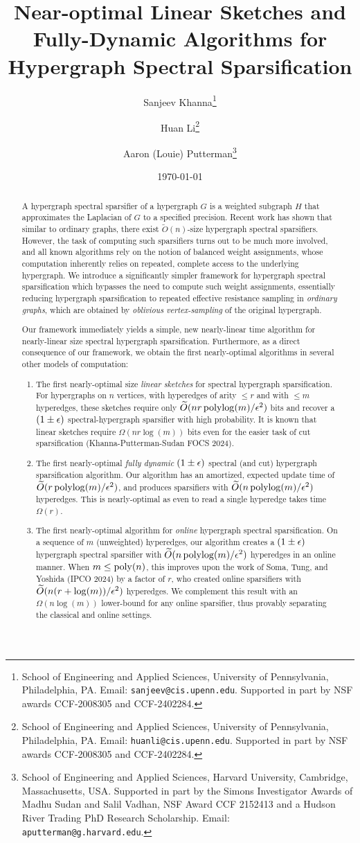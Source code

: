 \documentclass{article}
\title{
Near-optimal Linear Sketches and Fully-Dynamic Algorithms for Hypergraph Spectral Sparsification
}
\author{Sanjeev Khanna\thanks{School of Engineering and Applied Sciences, University of Pennsylvania, Philadelphia, PA. Email: \texttt{sanjeev@cis.upenn.edu}.
Supported in part by NSF awards CCF-2008305 and CCF-2402284.} \and Huan Li\thanks{School of Engineering and Applied Sciences, University of Pennsylvania, Philadelphia, PA. Email: \texttt{huanli@cis.upenn.edu}. Supported in part by NSF awards CCF-2008305 and CCF-2402284.} \and Aaron (Louie) Putterman\thanks{School of Engineering and Applied Sciences, Harvard University, Cambridge, Massachusetts, USA. Supported in part by the Simons Investigator Awards of Madhu Sudan and Salil Vadhan, NSF Award CCF 2152413 and a Hudson River Trading PhD Research Scholarship. Email: \texttt{aputterman@g.harvard.edu}.
}}
\date{\today}
\begin{document}
\maketitle

\begin{abstract}
A hypergraph spectral sparsifier of a hypergraph $G$ is a weighted subgraph $H$ that approximates the Laplacian of $G$ to a specified precision. Recent work has shown that similar to ordinary graphs, there exist $\widetilde{O}(n)$-size hypergraph spectral sparsifiers. 
However, the task of computing such sparsifiers turns out to be much more involved, and all known algorithms rely on the notion of balanced weight assignments, whose computation inherently relies on repeated, complete access to the underlying hypergraph. We introduce a significantly simpler framework for hypergraph spectral sparsification which bypasses the need to compute such weight assignments, essentially reducing hypergraph sparsification to repeated effective resistance sampling in \textit{ordinary graphs}, which are obtained by \textit{oblivious vertex-sampling} of the original hypergraph.

Our framework immediately yields a simple, new
nearly-linear time algorithm for nearly-linear size spectral hypergraph sparsification. 
Furthermore, as a direct consequence of our framework, we obtain the first nearly-optimal algorithms in several other models of computation:
\begin{enumerate}
    \item The first nearly-optimal size \textit{linear sketches} for spectral hypergraph sparsification. For hypergraphs on $n$ vertices, with hyperedges of arity $\leq r$ and with $\leq m$ hyperedges, these sketches require only $\widetilde{O}(n r \operatorname{polylog}(m) / \epsilon^2)$ bits and recover a $(1 \pm \epsilon)$ spectral-hypergraph sparsifier with high probability. It is known that linear sketches require $\Omega(nr \log(m))$ bits even for the easier task of cut sparsification (Khanna-Putterman-Sudan FOCS 2024).
    \item The first nearly-optimal \emph{fully dynamic} $(1 \pm \epsilon)$ spectral (and cut) hypergraph sparsification algorithm.
    Our algorithm has an amortized, expected update time of $\widetilde{O}(r \operatorname{polylog}(m) / \epsilon^2)$, and produces sparsifiers with $\widetilde{O}(n \operatorname{polylog}(m) / \epsilon^2)$ hyperedges. This is nearly-optimal as even to read a single hyperedge takes time $\Omega(r)$.
    \item The first nearly-optimal algorithm for \textit{online} hypergraph spectral sparsification. On a sequence of $m$ (unweighted) hyperedges, our algorithm creates a $(1 \pm \epsilon)$ hypergraph spectral sparsifier with $\widetilde{O}(n \operatorname{polylog}(m) / \epsilon^2)$ hyperedges in an online manner.
    When $m\leq \mathrm{poly}(n)$,
    this improves upon the work of Soma, Tung, and Yoshida (IPCO 2024) by a factor of $r$, who created online sparsifiers with $\widetilde{O}(n (r + \log(m)) / \epsilon^2)$ hyperedges.
    We complement this result with an $\Omega(n \log(m))$ lower-bound for any online sparsifier, thus provably separating the classical and online settings.  
\end{enumerate}


\end{abstract}
\end{document}
